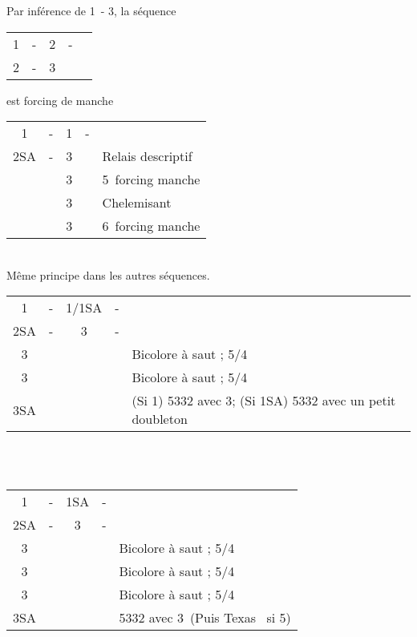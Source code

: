 \documentclass[a4paper, oneside, 11pt]{report}
\begin{document}
		Par inférence de 1\pique\ - 3\coeur, la séquence 		
		\begin{tabular}{cccc|l}
		1\pique & - & 2\coeur & - &\\
		2\pique & - & 3\coeur && \\
		\end{tabular}
		est forcing de manche\\
	
		\begin{tabular}{cccc|l}
		1\coeur & - & 1\pique & - &\\
		2SA & - & 3\trefle && Relais descriptif\\
		&& 3\carreau && 5\pique\ forcing manche\\
		&& 3\coeur && Chelemisant\\
		&& 3\pique && 6\pique\ forcing manche\\
		\end{tabular}\\
		Même principe dans les autres séquences.\\
		
		\begin{tabular}{cccc|l}
		1\coeur & - & 1\pique/1SA & - &\\
		2SA & - & 3\trefle & - &\\
		3\carreau &&&& Bicolore à saut ; 5\coeur/4\carreau\\
		3\coeur &&&& Bicolore à saut ; 5\coeur/4\trefle\\
		3SA &&&& (Si 1\pique) 5332 avec 3\pique ; (Si 1SA) 5332 avec un petit doubleton \pique\\
		\end{tabular}\\\\
		
		\begin{tabular}{cccc|l}
		1\pique & - & 1SA & - &\\
		2SA & - & 3\trefle & - &\\
		3\carreau &&&& Bicolore à saut ; 5\pique/4\carreau\\
		3\coeur &&&& Bicolore à saut ; 5\pique/4\coeur\\
		3\pique &&&& Bicolore à saut ; 5\pique/4\trefle\\
		3SA &&&& 5332 avec 3\coeur\ (Puis Texas \coeur\ si 5\coeur)\\
		\end{tabular}\\\\
\end{document}
